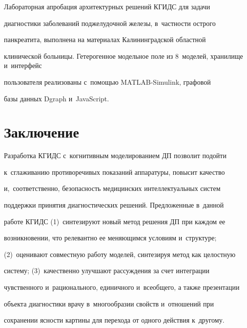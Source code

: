   

  Лабораторная апробация архитектурных решений КГИДС для задачи 

диагностики заболеваний поджелудочной железы, в~част\-ности острого 

панкреатита, выполнена на материалах Калининградской областной 

клинической больницы. Гетерогенное модельное поле из 8~моделей, хранилище и~интерфейс 

пользователя реализованы с~по\-мощью \mbox{MATLAB}-Simulink, графовой 

базы данных \mbox{Dgraph} и~\mbox{JavaScript.}



\section{Заключение}



  Разработка КГИДС с~когнитивным моделированием ДП позволит подойти 

к~сглаживанию противоречивых показаний аппаратуры, повысит качество 

и,~соответственно, безопасность медицинских интеллектуальных систем 

поддержки принятия диагностических решений. Предложенные в~данной 

работе КГИДС (1)~синтезируют новый метод решения ДП при каждом ее 

возникновении, что релевантно ее меняющимся условиям и~структуре; 

(2)~оценивают совместную работу моделей, синтезируя метод как целостную 

систему; (3)~качественно улучшают рассуждения за счет интеграции 

чувственного и~рационального, единичного и~всеобщего, а также презентации 

объекта диагностики врачу в~многообразии свойств и~отношений при 

сохранении ясности картины для перехода от одного действия к~другому.

  

